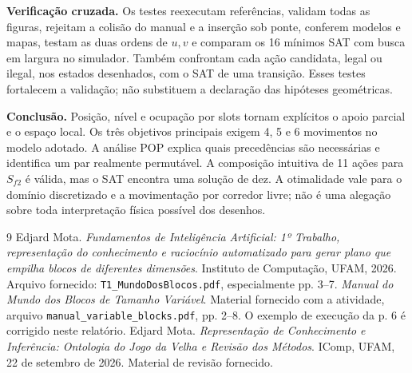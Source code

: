 \documentclass[11pt,a4paper]{article}
\begin{document}
\textbf{Verificação cruzada.} Os testes reexecutam referências, validam todas as figuras, rejeitam a colisão do manual e a inserção sob ponte, conferem modelos e mapas, testam as duas ordens de $u,v$ e comparam os 16 mínimos SAT com busca em largura no simulador. Também confrontam cada ação candidata, legal ou ilegal, nos estados desenhados, com o SAT de uma transição. Esses testes fortalecem a validação; não substituem a declaração das hipóteses geométricas.

\textbf{Conclusão.} Posição, nível e ocupação por slots tornam explícitos o apoio parcial e o espaço local. Os três objetivos principais exigem 4, 5 e 6 movimentos no modelo adotado. A análise POP explica quais precedências são necessárias e identifica um par realmente permutável. A composição intuitiva de 11 ações para $S_{f2}$ é válida, mas o SAT encontra uma solução de dez. A otimalidade vale para o domínio discretizado e a movimentação por corredor livre; não é uma alegação sobre toda interpretação física possível dos desenhos.

\begin{thebibliography}{9}
 Edjard Mota. \emph{Fundamentos de Inteligência Artificial: 1º Trabalho, representação do conhecimento e raciocínio automatizado para gerar plano que empilha blocos de diferentes dimensões}. Instituto de Computação, UFAM, 2026. Arquivo fornecido: \texttt{T1\_MundoDosBlocos.pdf}, especialmente pp. 3--7.
 \emph{Manual do Mundo dos Blocos de Tamanho Variável}. Material fornecido com a atividade, arquivo \texttt{manual\_variable\_blocks.pdf}, pp. 2--8. O exemplo de execução da p. 6 é corrigido neste relatório.
 Edjard Mota. \emph{Representação de Conhecimento e Inferência: Ontologia do Jogo da Velha e Revisão dos Métodos}. IComp, UFAM, 22 de setembro de 2026. Material de revisão fornecido.
\end{thebibliography}
\end{document}
